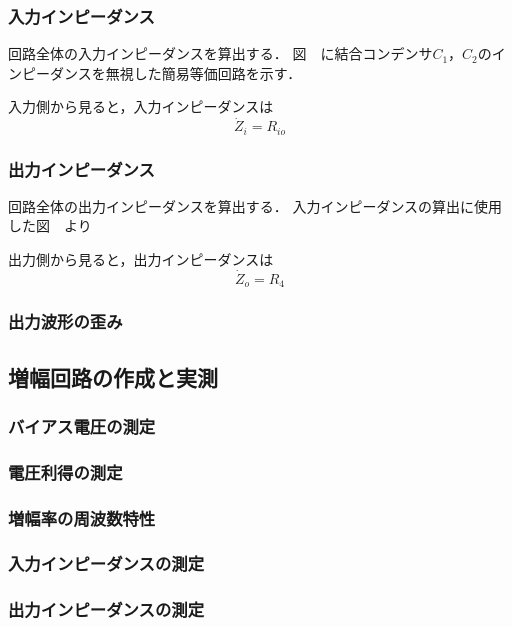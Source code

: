 \documentclass[dvipdfmx,titlepage,a4j]{jsarticle}  %
\numberwithin{equation}{section}
\begin{document}
\subsubsection{入力インピーダンス}
回路全体の入力インピーダンスを算出する．
図　に結合コンデンサ$C_1$，$C_2$のインピーダンスを無視した簡易等価回路を示す．

入力側から見ると，入力インピーダンスは
\begin{equation}
  \dot{Z}_i = R_{io}
\end{equation}

\subsubsection{出力インピーダンス}
回路全体の出力インピーダンスを算出する．
入力インピーダンスの算出に使用した図　より

出力側から見ると，出力インピーダンスは
\begin{equation}
  \dot{Z}_o = R_4
\end{equation}

\subsubsection{出力波形の歪み}

\subsection{増幅回路の作成と実測}

\subsubsection{バイアス電圧の測定}

\subsubsection{電圧利得の測定}

\subsubsection{増幅率の周波数特性}

\subsubsection{入力インピーダンスの測定}

\subsubsection{出力インピーダンスの測定}
\end{document}
